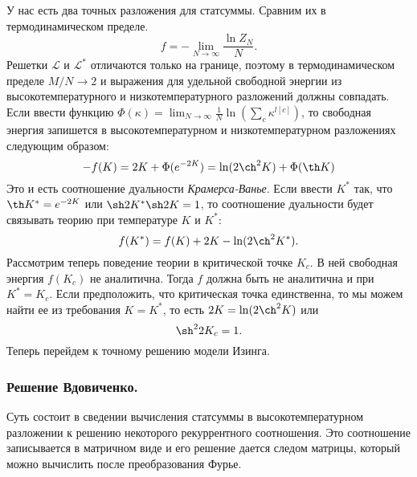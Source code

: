 \documentclass[a4paper,12pt]{article}
\theoremstyle{definition}
\theoremstyle{definition}
\theoremstyle{definition}
\begin{document}
У нас есть два точных разложения для статсуммы. Сравним их в термодинамическом пределе.
\begin{equation}
  \label{eq:109}
  f=-\lim_{N\to \infty}\frac{\ln Z_N}{N}.
\end{equation}
Решетки $\mathcal{L}$ и $\mathcal{L}^*$ отличаются только на границе, поэтому в термодинамическом
пределе $M/N\to 2$ и выражения для удельной свободной энергии из высокотемпературного и
низкотемпературного разложений должны совпадать. Если ввести функцию $\Phi(\kappa)=\lim_{N\to
  \infty}\frac{1}{N} \ln \left(\sum_c \kappa^{l[c]}\right)$, то свободная энергия запишется в
высокотемпературном и низкотемпературном разложениях следующим образом: 
\begin{equation}
  \label{eq:110}
  -f(K)=2K+\Phi(e^{-2K})=\ln(2\ch^2 K)+\Phi(\th K)
\end{equation}
Это и есть соотношение дуальности {\it Крамерса-Ванье}. Если ввести $K^*$ так, что $\th K^*=e^{-2K}$
или $\sh 2K^* \sh 2K=1$, то соотношение дуальности будет связывать теорию при температуре $K$ и
$K^*$: 
\begin{equation}
  \label{eq:111}
  f(K^*)=f(K)+2K-\ln(2\ch^2 K^*).
\end{equation}
Рассмотрим теперь поведение теории в критической точке $K_c$. В ней свободная энергия $f(K_c)$ не
аналитична. Тогда $f$ должна быть не аналитична и при $K^*=K_c$. Если предположить, что критическая
точка единственна, то мы можем найти ее из требования $K=K^*$, то есть $2K=\ln(2\ch^2 K)$ или 
\begin{equation}
  \label{eq:112}
  \sh^2 2K_c=1.
\end{equation}
Теперь перейдем к точному решению модели Изинга.

\subsubsection{Решение Вдовиченко.}
\label{sec:ising-solution}
Суть состоит в сведении вычисления статсуммы в высокотемпературном разложении к решению некоторого
рекуррентного соотношения. Это соотношение записывается в матричном виде и его решение дается следом
матрицы, который можно вычислить после преобразования Фурье. 
\end{document}
